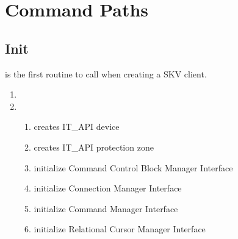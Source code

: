 %

\section{Command Paths}\label{sec:skv:commands}

\subsection{Init}
 is the first routine to call when creating a SKV
client.
\begin{enumerate} \parskip-0.5ex
\item {}
\item {}
  \begin{enumerate} \parskip-0.5ex
  \item creates IT\_API device
  \item creates IT\_API protection zone
  \item initialize Command Control Block Manager Interface
  \item initialize Connection Manager Interface
  \item initialize Command Manager Interface
  \item initialize Relational Cursor Manager Interface
  \end{enumerate}
\end{enumerate}


